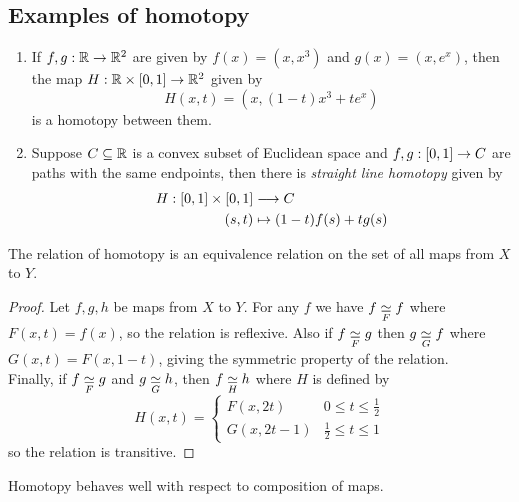 \subsection*{Examples of homotopy}
\begin{enumerate}
    \item If $f,g : \mathbb{R} \rightarrow \mathbb{R}^2$ are given by $f(x) = (x, x^3)$ and $g(x) = (x, e^x)$, then the map $H : \mathbb{R} \times [0,1] \rightarrow \mathbb{R}^2$ given by
          \[
              H (x,t) = \left(x, (1-t)x^3 + te^x\right)
          \]
          is a homotopy between them.
    \item Suppose $C \subseteq \mathbb{R}$ is a convex subset of Euclidean space and $f,g : [0,1] \rightarrow C$ are paths with the same endpoints, then there is \textit{straight line homotopy} given by
          \begin{align*}
              H : [0,1] \times [0,1] & \longrightarrow C                     \\
              (s,t)                  & \mapsto (1-t) f(s) + tg(s)
          \end{align*}


\end{enumerate}

\begin{lem}
    The relation of homotopy is an equivalence relation on the set of all maps from $X$ to $Y$.
\end{lem}
\begin{proof}
    Let $f,g,h$ be maps from $X$ to $Y$. For any $f$ we have $f \underset{F}{\simeq} f$ where $F(x,t) = f(x)$, so the relation is reflexive. Also if $f \underset{F}{\simeq} g$ then $g \underset{G}{\simeq} f$ where $G(x,t) = F(x, 1-t)$, giving the symmetric property of the relation.
    \\
    Finally, if $f \underset{F}{\simeq} g$ and $g \underset{G}{\simeq} h$, then $f \underset{H}{\simeq} h$ where $H$ is defined by
    \begin{equation*}
        H(x,t) = \begin{cases}
            F(x, 2t)     & 0 \le t \le \frac12 \\
            G(x, 2t - 1) & \frac12 \le t \le 1
        \end{cases}
    \end{equation*}
    so the relation is transitive.
\end{proof}

\begin{lem}\label{lem:hom-top-comp}
    Homotopy behaves well with respect to composition of maps.
\end{lem}

